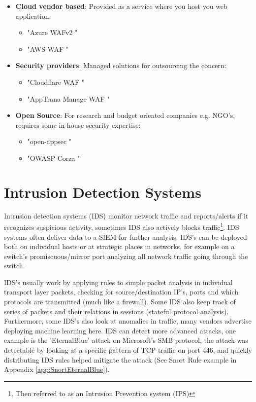 \documentclass[
	letterpaper, %
	10pt, %
	unnumberedsections, %
	twoside, %
]{APAAssignment}
\begin{document}
\begin{itemize}
	
	\item{\textbf{Cloud vendor based}: Provided as a service where you host you web application: 
	\begin{itemize}
		\item "Azure WAFv2 \cite{AzureWAF}"
		\item "AWS WAF \cite{AWSWAF}"
	\end{itemize}
	}
	
	\item{\textbf{Security providers}: Managed solutions for outsourcing the concern:
	\begin{itemize}
		\item "Cloudflare WAF \cite{CloudflareWAF}"
		\item "AppTrana Manage WAF \cite{AppTrana-WAF}"
	\end{itemize}
	}
	
	\item{
		\textbf{Open Source}: For research and budget oriented companies e.g. NGO's, requires some in-house security expertise: 
		\begin{itemize}
			\item "open-appsec \cite{open-appsec}"
			\item "OWASP Corza \cite{OWASPcorsa}"
		\end{itemize}
	} 
\end{itemize}


\section{Intrusion Detection Systems}
Intrusion detection systems (IDS) monitor network traffic and reports/alerts if it recognizes suspicious activity, sometimes IDS also actively blocks traffic\footnote{Then referred to as an Intrusion Prevention system (IPS)}. IDS systems often deliver data to a SIEM for further analysis. IDS's can be deployed both on individual hosts or at strategic places in networks, for example on a switch's promiscuous/mirror port analyzing all network traffic going through the switch. 

IDS's usually work by applying rules to simple packet analysis in individual transport layer packets, checking for source/destination IP's, ports and which protocols are transmitted (much like a firewall). Some IDS also keep track of series of packets and their relations in sessions (stateful protocol analysis). Furthermore, some IDS's also look at anomalies in traffic, many vendors advertise deploying machine learning here. IDS can detect more advanced attacks, one example is the 'EternalBlue' attack on Microsoft's SMB protocol, the attack was detectable by looking at a specific pattern of TCP traffic on port 446, and quickly distributing IDS rules helped mitigate the attack (See Snort Rule example in Appendix \ref{app:SnortEternalBlue}). 
\end{document}
